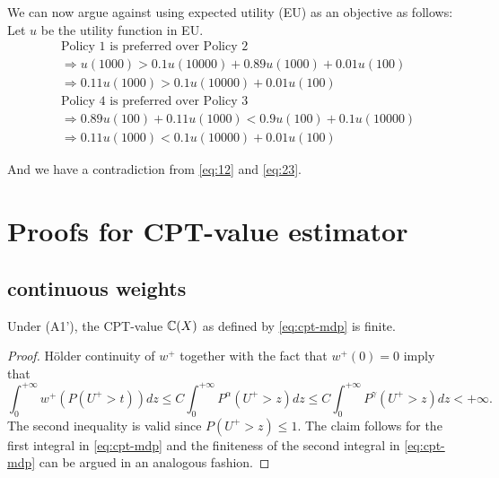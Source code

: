 \documentclass{article}
\numberwithin{equation}{section}
\numberwithin{theorem}{section}
\begin{document}
We can now argue against using expected utility (EU) as an objective as follows: Let $u$ be the utility function in EU.
\begin{align}
&\text{Policy 1 is preferred over Policy 2}\nonumber\\ 
&\Rightarrow u(1000) > 0.1 u(10000) + 0.89 u(1000) + 0.01 u(100)\nonumber\\
&\Rightarrow 0.11 u(1000) > 0.1 u(10000) + 0.01 u(100) \label{eq:12}\\[1ex]
&\text{Policy 4 is preferred over Policy 3}\nonumber\\ 
&\Rightarrow 0.89 u(100) + 0.11 u(1000) < 0.9 u(100) + 0.1 u(10000)\nonumber\\
&\Rightarrow 0.11 u(1000) < 0.1 u(10000) + 0.01 u(100) \label{eq:23}
\end{align}

And we have a contradiction from \eqref{eq:12} and \eqref{eq:23}.

\newpage


\section{Proofs for CPT-value estimator}
\label{appendix:cpt-est}

\subsection{\holder continuous weights}
\label{sec:holder-proofs}
\begin{proposition}
\label{prop:Holder-cpt-finite}
Under (A1'), the CPT-value $\mathbb{C}(X)$ as defined by \eqref{eq:cpt-mdp} is finite. 
\end{proposition}
\begin{proof}

H\"{o}lder continuity of $w^+$ together with the fact that $w^+(0)=0$ imply that 
$$
\int_0^{+\infty} w^+(P(U^+>t)) dz 
\le C \int_0^{+\infty} P^{\alpha} (U^+>z) dz
\le C \int_0^{+\infty} P^{\gamma} (U^+>z) dz 
<+\infty.
$$
The second inequality is valid since $P(U^+>z) \leq 1$. The claim follows for the first integral in \eqref{eq:cpt-mdp} and the finiteness of the second integral in \eqref{eq:cpt-mdp} can be argued in an analogous fashion.
\end{proof}
\end{document}
